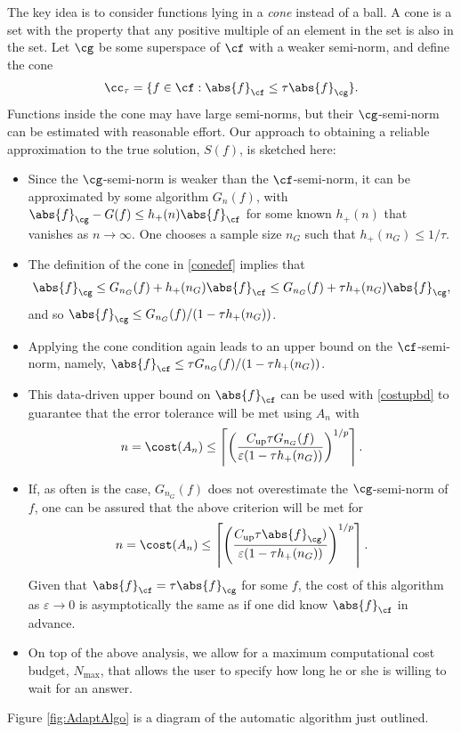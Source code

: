 \documentclass[]{elsarticle}
\DeclareMathOperator{\up}{up}
\theoremstyle{definition}
\theoremstyle{remark}
\newcommand{\Fnorm}[1]{\abs{#1}_{\cf}}
\newcommand{\Gnorm}[1]{\abs{#1}_{\cg}}
\begin{document}
The key idea is to consider functions lying in a \emph{cone} instead of a ball.  A cone is a set with the property that any positive multiple of an element in the set is also in the set.  Let $\cg$ be some superspace of $\cf$ with a weaker semi-norm, and define the cone
\begin{equation} \label{conedef}
\cc_{\tau}=\{f \in \cf : \Fnorm{f} \le \tau \Gnorm{f} \}.
\end{equation}
Functions inside the cone may have large semi-norms, but their $\cg$-semi-norm can be estimated with reasonable effort.  Our approach to obtaining a reliable approximation to the true solution, $S(f)$, is sketched here:

\begin{itemize}
\item Since the $\cg$-semi-norm is weaker than the $\cf$-semi-norm, it can be approximated by some algorithm $G_n(f)$, with $\Gnorm{f}-G(f) \le h_+(n)\Fnorm{f}$ for some known $h_+(n)$ that vanishes as $n \to \infty$.  One chooses a sample size $n_G$ such that $h_+(n_G) \le 1/\tau$.

\item The definition of the cone in \eqref{conedef} implies that 
\[
\Gnorm{f} \le G_{n_G}(f)+ h_+(n_G)\Fnorm{f} \le G_{n_G}(f)+ \tau h_+(n_G)\Gnorm{f},
\]
and so $\Gnorm{f} \le G_{n_G}(f)/(1 - \tau h_+(n_G))$.

\item Applying the cone condition again leads to an upper bound on the $\cf$-semi-norm, namely,  $\Fnorm{f} \le \tau G_{n_G}(f)/(1 - \tau h_+(n_G))$.

\item This data-driven upper bound on $\Fnorm{f}$ can be used with \eqref{costupbd} to guarantee that the error tolerance will be met using $A_n$ with
\[
n=\cost(A_n)\le \left \lceil\left(\frac{ C_{\up}\tau G_{n_G}(f)}{\varepsilon(1 - \tau h_+(n_G))}\right)^{1/p} \right \rceil.
\]

\item If, as often is the case, $G_{n_G}(f)$ does not overestimate the $\cg$-semi-norm of $f$, one can be assured that the above criterion will be met for 
\[
n=\cost(A_n)\le \left \lceil\left(\frac{ C_{\up}\tau \Gnorm{f})}{\varepsilon(1 - \tau h_+(n_G))}\right)^{1/p} \right \rceil.
\]
Given that $\Fnorm{f} = \tau \Gnorm{f}$ for some $f$, the cost of this algorithm as $\varepsilon \to 0$ is asymptotically the same as if one did know $\Fnorm{f}$ in advance.

\item On top of the above analysis, we allow for a maximum computational cost budget, $N_{\max}$, that allows the user to specify how long he or she is willing to wait for an answer.

\end{itemize} 
Figure \ref{fig:AdaptAlgo} is a diagram of the automatic algorithm just outlined.
\end{document}
